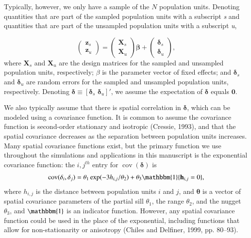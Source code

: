 \documentclass[]{elsarticle} %
\begin{document}
Typically, however, we only have a sample of the \(N\) population units.
Denoting quantities that are part of the sampled population units with a
subscript \emph{s} and quantities that are part of the unsampled
population units with a subscript \emph{u},

\begin{equation}
\begin{pmatrix} \label{equation:Zmarginal}
    \mathbf{z}_s      \\
    \mathbf{z}_u
\end{pmatrix}
=
\begin{pmatrix}
  \mathbf{X}_s    \\
  \mathbf{X}_u
\end{pmatrix}
\bm{\beta} +
\begin{pmatrix}
\bm{\delta}_s    \\
\bm{\delta}_u
\end{pmatrix},
\end{equation} where \(\mathbf{X}_s\) and \(\mathbf{X}_u\) are the
design matrices for the sampled and unsampled population units,
respectively; \(\beta\) is the parameter vector of fixed effects; and
\(\bm{\delta}_s\) and \(\bm{\delta}_u\) are random errors for the
sampled and unsampled population units, respectively. Denoting
\(\bm{\delta} \equiv [\bm{\delta}_s \,\, \bm{\delta}_u]'\), we assume
the expectation of \(\bm{\delta}\) equals \(\mathbf{0}\).

We also typically assume that there is spatial correlation in
\(\bm{\delta}\), which can be modeled using a covariance function. It is
common to assume the covariance function is second-order stationary and
isotropic (Cressie, 1993), and that the spatial covariance decreases as
the separation between population units increases. Many spatial
covariance functions exist, but the primary function we use throughout
the simulations and applications in this manuscript is the exponential
covariance function: the \(i,j^{th}\) entry for
\(\mathop{\mathrm{{cov}}}(\bm{\delta})\) is \mbox{}
\begin{align}\label{equation:expcov}
\mathop{\mathrm{{cov}}}(\delta_i, \delta_j) = \theta_1\exp(-3h_{i,j}/\theta_2) + \theta_3\mathbbm{1}\{\mathbf{h}_{i,j} = 0\}, 
\end{align} where \(h_{i,j}\) is the distance between population units
\(i\) and \(j\), and \(\bm{\theta}\) is a vector of spatial covariance
parameters of the partial sill \(\theta_1\), the range \(\theta_2\), and
the nugget \(\theta_3\), and \(\mathbbm{1}\) is an indicator function.
However, any spatial covariance function could be used in the place of
the exponential, including functions that allow for non-stationarity or
anisotropy (Chiles and Delfiner, 1999, pp. 80--93).
\end{document}
